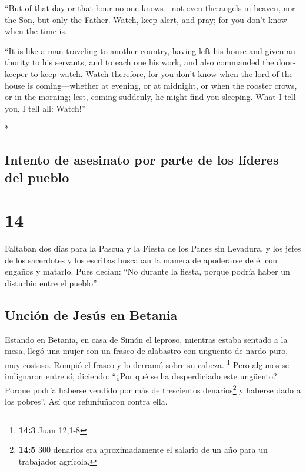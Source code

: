 \begin{paracol}{2}
\begin{otherlanguage}{english}
 ``But of that day or that hour no one knows---not even
the angels in heaven, nor the Son, but only the Father. 
Watch, keep alert, and pray; for you don't know when the time is.

 ``It is like a man traveling to another country, having
left his house and given authority to his servants, and to each one his
work, and also commanded the doorkeeper to keep watch. 
Watch therefore, for you don't know when the lord of the house is
coming---whether at evening, or at midnight, or when the rooster crows,
or in the morning;  lest, coming suddenly, he might find
you sleeping.  What I tell you, I tell all: Watch!''

\end{otherlanguage}

\switchcolumn[0]*

\hypertarget{intento-de-asesinato-por-parte-de-los-luxedderes-del-pueblo}{%
\subsection{Intento de asesinato por parte de los líderes del
pueblo}\label{intento-de-asesinato-por-parte-de-los-luxedderes-del-pueblo}}

\hypertarget{section-25}{%
\section{14}\label{section-25}}

 Faltaban dos días para la Pascua y la Fiesta de los Panes
sin Levadura, y los jefes de los sacerdotes y los escribas buscaban la
manera de apoderarse de él con engaños y matarlo.  Pues
decían: ``No durante la fiesta, porque podría haber un disturbio entre
el pueblo''.

\hypertarget{unciuxf3n-de-jesuxfas-en-betania}{%
\subsection{Unción de Jesús en
Betania}\label{unciuxf3n-de-jesuxfas-en-betania}}

 Estando en Betania, en casa de Simón el leproso, mientras
estaba sentado a la mesa, llegó una mujer con un frasco de alabastro con
ungüento de nardo puro, muy costoso. Rompió el frasco y lo derramó sobre
su cabeza. \footnote{\textbf{14:3} Juan 12,1-8}  Pero
algunos se indignaron entre sí, diciendo: ``¿Por qué se ha desperdiciado
este ungüento?  Porque podría haberse vendido por más de
trescientos denarios\footnote{\textbf{14:5} 300 denarios era
  aproximadamente el salario de un año para un trabajador agrícola.} y
haberse dado a los pobres''. Así que refunfuñaron contra ella.


\end{paracol}
